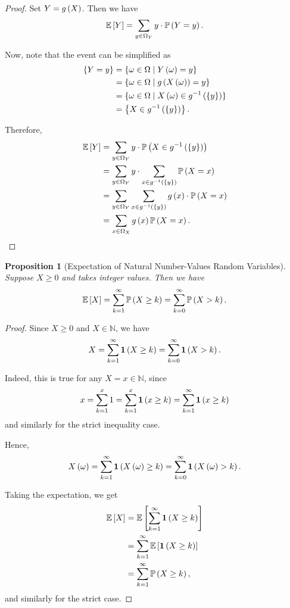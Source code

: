 \documentclass{article}
\newtheorem{proposition}[theorem]{Proposition}
\theoremstyle{definition}
\theoremstyle{remark}
\newcommand{\NN}{\mathbb{N}}
\newcommand{\Prob}{\mathbb{P}}
\newcommand{\Expt}{\mathbb{E}}
\newcommand{\inverse}{^{-1}}
\newcommand{\indicator}{\mathbf{1}}
\newcommand{\set}[2]{\{#1\mid #2\}}
\begin{document}
\begin{proof}
    Set \(Y = g\left(X\right)\). Then we have
    \[
        \Expt\bqty{Y} = \sum_{y \in \Omega_Y} y \cdot \Prob\pqty{Y = y}.
    \]

    Now, note that the event can be simplified as
    \begin{align*}
        \Bqty{Y = y} &= \set{\omega \in \Omega}{Y \pqty{\omega} = y} \\
        &= \set{\omega \in \Omega}{g\pqty{X\pqty{\omega}} = y} \\
        &= \set{\omega \in \Omega}{X\pqty{\omega} \in g\inverse \pqty{\Bqty{y}}} \\
        &= \Bqty{X \in g\inverse \pqty{\Bqty{y}}}.
    \end{align*}

    Therefore,
    \begin{align*}
        \Expt\bqty{Y} &= \sum_{y \in \Omega_Y} y \cdot \Prob\pqty{X \in g\inverse\pqty{\Bqty{y}}} \\
        &= \sum_{y \in \Omega_Y} y \cdot \sum_{x \in g\inverse\pqty{\Bqty{y}}} \Prob\pqty{X = x} \\
        &= \sum_{y \in \Omega_Y} \sum_{x \in g\inverse\pqty{\Bqty{y}}} g\pqty{x} \cdot \Prob\pqty{X = x} \\
        &= \sum_{x \in \Omega_X} g\pqty{x} \Prob\pqty{X = x}.
    \end{align*}
\end{proof}

\begin{proposition}[Expectation of Natural Number-Values Random Variables]
    \label{prop:expt-natural-number-random-variable}%
    Suppose \(X \geq 0\) and takes integer values. Then we have
    \[
        \Expt\bqty{X} = \sum_{k = 1}^{\infty} \Prob\pqty{X \geq k} = \sum_{k = 0}^{\infty} \Prob\pqty{X > k}.
    \]
\end{proposition}

\begin{proof}
    Since \(X \geq 0\) and \(X \in \NN\), we have
    \[
        X = \sum_{k = 1}^{\infty} \indicator \pqty{X \geq k} = \sum_{k = 0}^{\infty} \indicator \pqty{X > k}.
    \]

    Indeed, this is true for any \(X = x \in \NN\), since
    \[
        x = \sum_{k = 1}^{x} 1 = \sum_{k = 1}^{x} \indicator \pqty{x \geq k} = \sum_{k = 1}^{\infty} \indicator \pqty{x \geq k}
    \]
    and similarly for the strict inequality case.

    Hence,
    \[
        X \pqty{\omega} = \sum_{k = 1}^{\infty} \indicator \pqty{X \pqty{\omega} \geq k} = \sum_{k = 0}^{\infty} \indicator \pqty{X \pqty{\omega} > k}.
    \]

    Taking the expectation, we get
    \begin{align*}
        \Expt\bqty{X} &= \Expt\bqty{\sum_{k = 1}^{\infty} \indicator\pqty{X \geq k}} \\
        &= \sum_{k = 1}^{\infty} \Expt\bqty{\indicator\pqty{X \geq k}} \\
        &= \sum_{k = 1}^{\infty} \Prob\pqty{X \geq k},
    \end{align*}
    and similarly for the strict case.
\end{proof}
\end{document}
